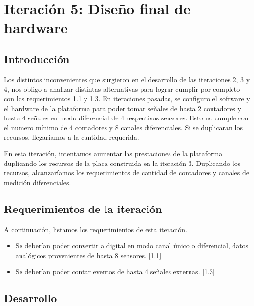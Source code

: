\chapter{Iteración 5: Diseño final de hardware} %
\label{cha:iteracion_5}

\section{Introducción} %
\label{sec:introduccion}

Los distintos inconvenientes que surgieron en el desarrollo de las iteraciones 2, 3 y 4, nos obligo a analizar distintas alternativas para lograr cumplir por completo con los requerimientos 1.1 y 1.3. En iteraciones pasadas, se configuro el software y el hardware de la plataforma para poder tomar señales de hasta 2 contadores y hasta 4 señales en modo diferencial de 4 respectivos sensores. Esto no cumple con el numero mínimo de 4 contadores y 8 canales diferenciales. Si se duplicaran los recursos, llegaríamos a la cantidad requerida.

En esta iteración, intentamos aumentar las prestaciones de la plataforma duplicando los recursos de la placa construida en la iteración 3. Duplicando los recursos, alcanzaríamos los requerimientos de cantidad de contadores y canales de medición diferenciales.


\section{Requerimientos de la iteración} %
\label{sec:requerimientos_de_la_iteracion}

A continuación, listamos los requerimientos de esta iteración.

\begin{itemize}
  \item Se deberían poder convertir a digital en modo canal único o diferencial, datos analógicos provenientes de hasta 8 sensores. [1.1]
  \item Se deberían poder contar eventos de hasta 4 señales externas. [1.3]
\end{itemize}


\section{Desarrollo} %
\label{sec:desarrollo}

